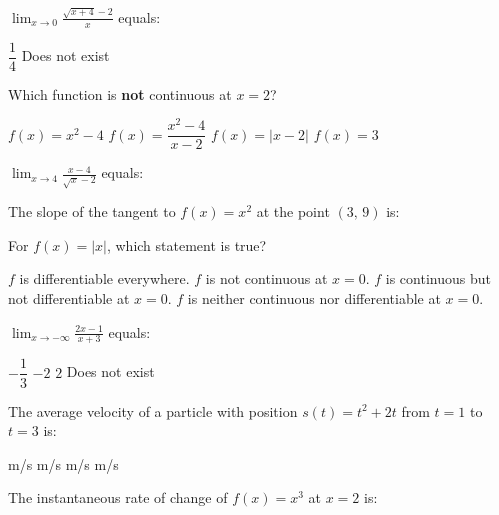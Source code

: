 \documentclass[addpoints]{exam}
\begin{document}
\begin{questions}
\question[1] $\displaystyle\lim_{x \to 0} \frac{\sqrt{x+4} - 2}{x}$ equals:
\begin{choices}
    \correctchoice $\dfrac{1}{4}$
    \choice Does not exist
\end{choices}

\question[1] Which function is \textbf{not} continuous at $x = 2$?
\begin{choices}
    \choice $f(x) = x^2 - 4$
    \correctchoice $f(x) = \dfrac{x^2 - 4}{x - 2}$
    \choice $f(x) = |x - 2|$
    \choice $f(x) = 3$
\end{choices}

\question[1] $\displaystyle\lim_{x \to 4} \frac{x - 4}{\sqrt{x} - 2}$ equals:
\begin{choices}
\end{choices}

\question[1] The slope of the tangent to $f(x) = x^2$ at the point $(3,\, 9)$ is:
\begin{choices}
\end{choices}

\question[1] For $f(x) = |x|$, which statement is true?
\begin{choices}
    \choice $f$ is differentiable everywhere.
    \choice $f$ is not continuous at $x = 0$.
    \correctchoice $f$ is continuous but not differentiable at $x = 0$.
    \choice $f$ is neither continuous nor differentiable at $x = 0$.
\end{choices}

\question[1] $\displaystyle\lim_{x \to -\infty} \frac{2x - 1}{x + 3}$ equals:
\begin{choices}
    \choice $-\dfrac{1}{3}$
    \choice $-2$
    \correctchoice $2$
    \choice Does not exist
\end{choices}

\question[1] The average velocity of a particle with position $s(t) = t^2 + 2t$
from $t = 1$ to $t = 3$ is:
\begin{choices}
     m/s
     m/s
     m/s
     m/s
\end{choices}

\question[1] The instantaneous rate of change of $f(x) = x^3$ at $x = 2$ is:
\begin{choices}
\end{choices}



\end{questions}
\end{document}
